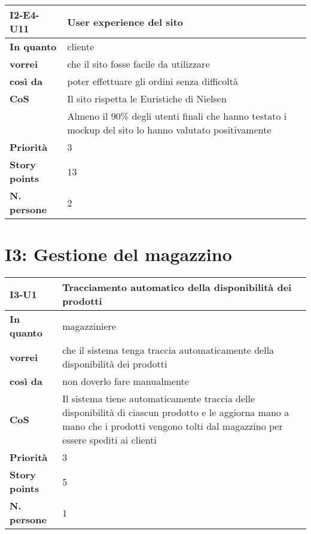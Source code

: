 \begin{table}[H]
  \begin{tabularx}{\textwidth}{lX}
    \toprule
    \textbf{I2-E4-U11} & \textbf{User experience del sito} \\
    \midrule
    \textbf{In quanto} & cliente \\
    \textbf{vorrei} & che il sito fosse facile da utilizzare \\
    \textbf{così da} & poter effettuare gli ordini senza difficoltà \\
    \midrule
    \textbf{CoS} & Il sito rispetta le Euristiche di Nielsen \\
    & Almeno il 90\% degli utenti finali che hanno testato i mockup del sito lo hanno valutato positivamente \\
    \midrule
    \textbf{Priorità} & 3 \\
    \textbf{Story points} & 13 \\
    \textbf{N. persone} & 2 \\
    \bottomrule
  \end{tabularx}
  \label{user-story:i2-e4-u11}
\end{table}

\section*{I3: Gestione del magazzino}

\begin{table}[H]
  \begin{tabularx}{\textwidth}{lX}
    \toprule
    \textbf{I3-U1} & \textbf{Tracciamento automatico della disponibilità dei prodotti} \\
    \midrule
    \textbf{In quanto} & magazziniere \\
    \textbf{vorrei} & che il sistema tenga traccia automaticamente della disponibilità dei prodotti \\
    \textbf{così da} & non doverlo fare manualmente \\
    \midrule
    \textbf{CoS} & Il sistema tiene automaticamente traccia delle disponibilità di ciascun prodotto e le aggiorna mano a mano che i prodotti vengono tolti dal magazzino per essere spediti ai clienti \\
    \midrule
    \textbf{Priorità} & 3 \\
    \textbf{Story points} & 5 \\
    \textbf{N. persone} & 1 \\
    \bottomrule
  \end{tabularx}
  \label{user-story:i3-u1}
\end{table}


